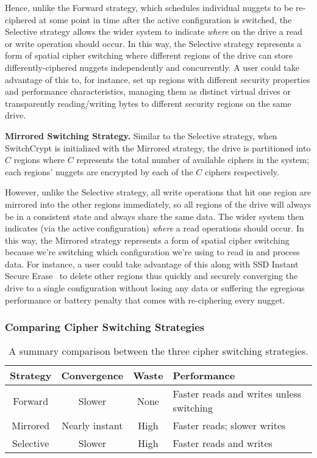 Hence, unlike the Forward strategy, which schedules individual nuggets to be
re-ciphered at some point in time after the active configuration is switched,
the Selective strategy allows the wider system to indicate \emph{where} on the
drive a read or write operation should occur. In this way, the Selective
strategy represents a form of spatial cipher switching where different regions
of the drive can store differently-ciphered nuggets independently and
concurrently. A user could take advantage of this to, for instance, set up
regions with different security properties and performance characteristics,
managing them as distinct virtual drives or transparently reading/writing bytes
to different security regions on the same drive.

\textbf{Mirrored Switching Strategy.} Similar to the Selective strategy, when
SwitchCrypt is initialized with the Mirrored strategy, the drive is partitioned
into $C$ regions where $C$ represents the total number of available ciphers in
the system; each regions' nuggets are encrypted by each of the $C$ ciphers
respectively.

However, unlike the Selective strategy, all write operations that hit one region
are mirrored into the other regions immediately, so all regions of the drive
will always be in a consistent state and always share the same data. The wider
system then indicates (via the active configuration) \emph{where} a read
operations should occur. In this way, the Mirrored strategy represents a form of
spatial cipher switching because we're switching which configuration we're using
to read in and process data. For instance, a user could take advantage of this
along with SSD Instant Secure Erase~\cite{ISE1,ISE2,ISE3} to delete other
regions thus quickly and securely converging the drive to a single configuration
without losing any data or suffering the egregious performance or battery
penalty that comes with re-ciphering every nugget.

\subsubsection{Comparing Cipher Switching Strategies}

\begin{table}[ht]
   \begin{tabular}{@{}|c|c|c|C{25mm}|@{}}
      \toprule
      \textbf{Strategy} & \textbf{Convergence} & \textbf{Waste} &
      \textbf{Performance} \\
      \midrule
      Forward   & Slower       & None & Faster reads and writes unless switching
      \\\hline
      Mirrored  & Nearly instant & High & Faster reads; slower writes \\
      \hline
      Selective & Slower       & High & Faster reads and writes  \\
      \hline
   \end{tabular}
   \caption{A summary comparison between the three cipher switching strategies.}
   \label{tbl:strategies-advantages}
\end{table}

